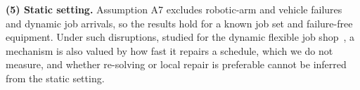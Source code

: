 \documentclass[preprint,review,12pt,authoryear]{elsarticle}
\begin{document}
\textbf{(5) Static setting.}
Assumption A7 excludes robotic-arm and vehicle failures and dynamic job arrivals, so the results hold for a known job set and failure-free equipment. Under such disruptions, studied for the dynamic flexible job shop~\citep{gui2023dynamic,zhao2026deep,dauzereperes2024fjsp}, a mechanism is also valued by how fast it repairs a schedule, which we do not measure, and whether re-solving or local repair is preferable cannot be inferred from the static setting.



\end{document}
